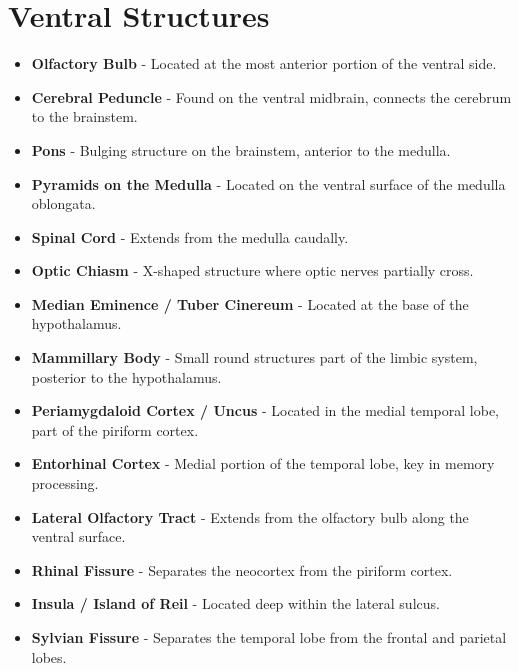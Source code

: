 \section{Ventral Structures}
\begin{itemize}
    \item \textbf{Olfactory Bulb} - Located at the most anterior portion of the ventral side.
    \item \textbf{Cerebral Peduncle} - Found on the ventral midbrain, connects the cerebrum to the brainstem.
    \item \textbf{Pons} - Bulging structure on the brainstem, anterior to the medulla.
    \item \textbf{Pyramids on the Medulla} - Located on the ventral surface of the medulla oblongata.
    \item \textbf{Spinal Cord} - Extends from the medulla caudally.
    \item \textbf{Optic Chiasm} - X-shaped structure where optic nerves partially cross.
    \item \textbf{Median Eminence / Tuber Cinereum} - Located at the base of the hypothalamus.
    \item \textbf{Mammillary Body} - Small round structures part of the limbic system, posterior to the hypothalamus.
    \item \textbf{Periamygdaloid Cortex / Uncus} - Located in the medial temporal lobe, part of the piriform cortex.
    \item \textbf{Entorhinal Cortex} - Medial portion of the temporal lobe, key in memory processing.
    \item \textbf{Lateral Olfactory Tract} - Extends from the olfactory bulb along the ventral surface.
    \item \textbf{Rhinal Fissure} - Separates the neocortex from the piriform cortex.
    \item \textbf{Insula / Island of Reil} - Located deep within the lateral sulcus.
    \item \textbf{Sylvian Fissure} - Separates the temporal lobe from the frontal and parietal lobes.
\end{itemize}

